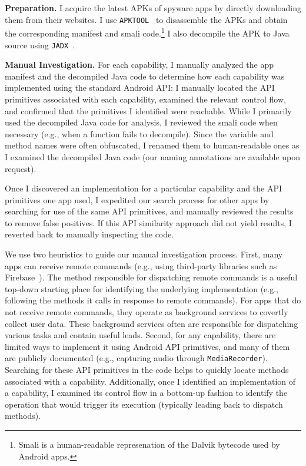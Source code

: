 \textbf{Preparation.} I acquire the latest APKs of spyware apps by directly downloading them from their websites. I use \texttt{APKTOOL}~\cite{ApktoolA72:online} to disassemble the APKs and obtain the corresponding manifest and smali code.\footnote{Smali is a human-readable represenation of the Dalvik bytecode used by Android apps.} I also decompile the APK to Java source using \texttt{JADX}~\cite{skylotja9:online}.

\textbf{Manual Investigation.}
For each capability, I manually analyzed the app manifest and the decompiled Java code to determine how
each capability was implemented using the standard Android API: I manually located the API primitives associated with each capability, examined the relevant control flow, and confirmed that the primitives I identified were reachable. While I primarily used the decompiled Java code for
analysis, I reviewed the smali code when necessary (e.g., when a function fails
to decompile). Since the variable and method names were often obfuscated, I renamed them to human-readable ones as I examined the decompiled Java code (our naming annotations are available upon request).

Once I discovered an implementation for a particular capability and
the API primitives one app used, I expedited our search process
for other apps by searching for use of the same API primitives, and manually
reviewed the results to remove false positives. If this API similarity
approach did not yield results, I reverted back to manually
inspecting the code.

We use two heuristics to guide our manual investigation process.
First, many apps can receive remote commands (e.g., using third-party
libraries such as Firebase~\cite{Firebase21:online}).  The method
responsible for dispatching remote commands is a useful top-down
starting place for identifying the underlying implementation (e.g.,
following the methods it calls in response to remote commands).  For
apps that do not receive remote commands, they operate as background
services to covertly collect user data. These background services
often are responsible for dispatching various tasks and contain useful
leads. Second, for any capability, there are limited ways to implement
it using Android API primitives, and many of them are publicly
documented (e.g., capturing audio through \texttt{MediaRecorder}). Searching for these API primitives in the code helps to
quickly locate methods associated with a capability. Additionally,
once I identified an implementation of a capability, I examined its
control flow in a bottom-up fashion to identify the operation that
would trigger its execution (typically leading back to dispatch
methods).

